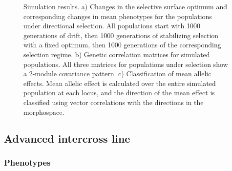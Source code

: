 \begin{refsection}
\begin{figure}[htbp]
    \caption[Simulation results]{Simulation results. a) Changes in the selective surface optimum and corresponding changes in mean phenotypes for the populations under directional selection. All populations start with 1000 generations of drift, then 1000 generations of stabilizing selection with a fixed optimum, then 1000 generations of the corresponding selection regime. b) Genetic correlation matrices for simulated populations. All three matrices for populations under selection show a 2-module covariance pattern. c) Classification of mean allelic effects. Mean allelic effect is calculated over the entire simulated population at each locus, and the direction of the mean effect is classified using vector correlations with the directions in the morphospace.}
    \label{simulated}
\end{figure}

\subsection{Advanced intercross line}

\subsubsection{Phenotypes}


\end{refsection}
